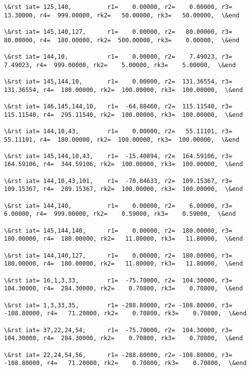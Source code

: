 \documentclass[11pt]{article}
\begin{document}
\begin{Verbatim}[commandchars=\\\{\}]
\&rst iat= 125,140,          r1=    0.00000, r2=    0.00000, r3=   13.30000, r4=  999.00000, rk2=   50.00000, rk3=   50.00000,  \&end

\&rst iat= 145,140,127,      r1=    0.00000, r2=   80.00000, r3=   80.00000, r4=  180.00000, rk2=  500.00000, rk3=    0.00000,  \&end

\&rst iat= 144,10,           r1=    0.00000, r2=    7.49023, r3=    7.49023, r4=  999.00000, rk2=    5.00000, rk3=    5.00000,  \&end

\&rst iat= 145,144,10,       r1=    0.00000, r2=  131.36554, r3=  131.36554, r4=  180.00000, rk2=  100.00000, rk3=  100.00000,  \&end

\&rst iat= 146,145,144,10,   r1=  -64.88460, r2=  115.11540, r3=  115.11540, r4=  295.11540, rk2=  100.00000, rk3=  100.00000,  \&end

\&rst iat= 144,10,43,        r1=    0.00000, r2=   55.11101, r3=   55.11101, r4=  180.00000, rk2=  100.00000, rk3=  100.00000,  \&end

\&rst iat= 145,144,10,43,    r1=  -15.40894, r2=  164.59106, r3=  164.59106, r4=  344.59106, rk2=  100.00000, rk3=  100.00000,  \&end

\&rst iat= 144,10,43,101,    r1=  -70.84633, r2=  109.15367, r3=  109.15367, r4=  289.15367, rk2=  100.00000, rk3=  100.00000,  \&end

\&rst iat= 144,140,          r1=    0.00000, r2=    6.00000, r3=    6.00000, r4=  999.00000, rk2=    0.59000, rk3=    0.59000,  \&end

\&rst iat= 145,144,140,      r1=    0.00000, r2=  180.00000, r3=  180.00000, r4=  180.00000, rk2=   11.80000, rk3=   11.80000,  \&end

\&rst iat= 144,140,127,      r1=    0.00000, r2=  180.00000, r3=  180.00000, r4=  180.00000, rk2=   11.80000, rk3=   11.80000,  \&end

\&rst iat= 16,1,3,33,        r1=  -75.70000, r2=  104.30000, r3=  104.30000, r4=  284.30000, rk2=    0.70800, rk3=    0.70800,  \&end

\&rst iat= 1,3,33,35,        r1= -288.80000, r2= -108.80000, r3= -108.80000, r4=   71.20000, rk2=    0.70800, rk3=    0.70800,  \&end

\&rst iat= 37,22,24,54,      r1=  -75.70000, r2=  104.30000, r3=  104.30000, r4=  284.30000, rk2=    0.70800, rk3=    0.70800,  \&end

\&rst iat= 22,24,54,56,      r1= -288.80000, r2= -108.80000, r3= -108.80000, r4=   71.20000, rk2=    0.70800, rk3=    0.70800,  \&end


\end{Verbatim}
\end{document}

